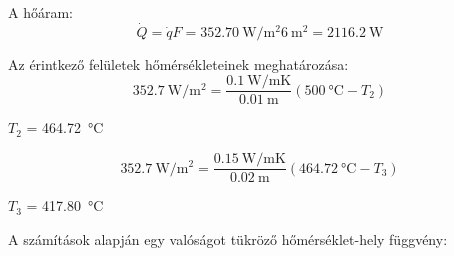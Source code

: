 A hőáram:
\begin{equation}
\dot{Q} = \dot{q} F = \SI{352.70}{\watt\per\meter\squared} \SI{6}{\meter\squared} = \SI{2116.2}{\watt}
\end{equation}

Az érintkező felületek hőmérsékleteinek meghatározása:
\begin{equation}
\SI{352.7}{\watt\per\meter\squared} = \frac{\SI{0.1}{\watt\per\meter\kelvin}}{\SI{0.01}{\meter}} (\SI{500}{\celsius} - T_2) 
\end{equation}
\begin{center}
	$T_2$ = \SI{464.72}{\celsius}
\end{center}

\begin{equation}
\SI{352.7}{\watt\per\meter\squared} = \frac{\SI{0.15}{\watt\per\meter\kelvin}}{\SI{0.02}{\meter}} (\SI{464,72}{\celsius} - T_3) 
\end{equation}
\begin{center}
	$T_3$ = \SI{417.80}{\celsius}
\end{center}

A számítások alapján egy valóságot tükröző hőmérséklet-hely függvény:
\vspace{2mm}


